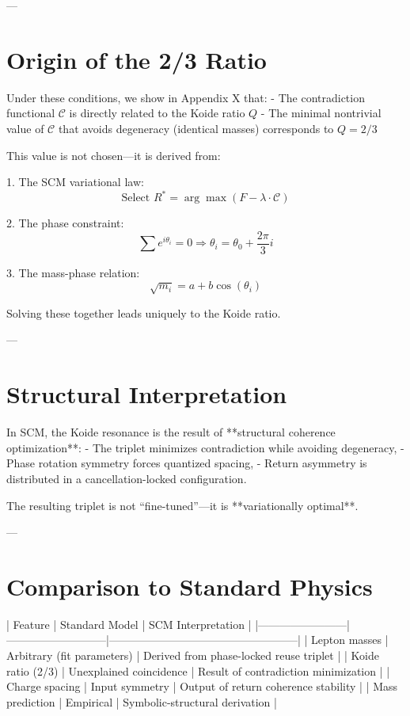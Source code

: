 ---

\section{Origin of the 2/3 Ratio}

Under these conditions, we show in Appendix X that:
- The contradiction functional $\mathcal{C}$ is directly related to the Koide ratio $Q$
- The minimal nontrivial value of $\mathcal{C}$ that avoids degeneracy (identical masses) corresponds to $Q = 2/3$

This value is not chosen—it is derived from:

1. The SCM variational law:  
   \[
   \text{Select } R^* = \arg\max(F - \lambda \cdot \mathcal{C})
   \]

2. The phase constraint:  
   \[
   \sum e^{i\theta_i} = 0 \Rightarrow \theta_i = \theta_0 + \frac{2\pi}{3} i
   \]

3. The mass-phase relation:  
   \[
   \sqrt{m_i} = a + b \cos(\theta_i)
   \]

Solving these together leads uniquely to the Koide ratio.

---

\section{Structural Interpretation}

In SCM, the Koide resonance is the result of **structural coherence optimization**:
- The triplet minimizes contradiction while avoiding degeneracy,
- Phase rotation symmetry forces quantized spacing,
- Return asymmetry is distributed in a cancellation-locked configuration.

The resulting triplet is not “fine-tuned”—it is **variationally optimal**.

---

\section{Comparison to Standard Physics}

| Feature                 | Standard Model            | SCM Interpretation                                |
|------------------------|---------------------------|---------------------------------------------------|
| Lepton masses          | Arbitrary (fit parameters) | Derived from phase-locked reuse triplet           |
| Koide ratio (2/3)      | Unexplained coincidence    | Result of contradiction minimization              |
| Charge spacing         | Input symmetry             | Output of return coherence stability              |
| Mass prediction        | Empirical                 | Symbolic-structural derivation                    |

